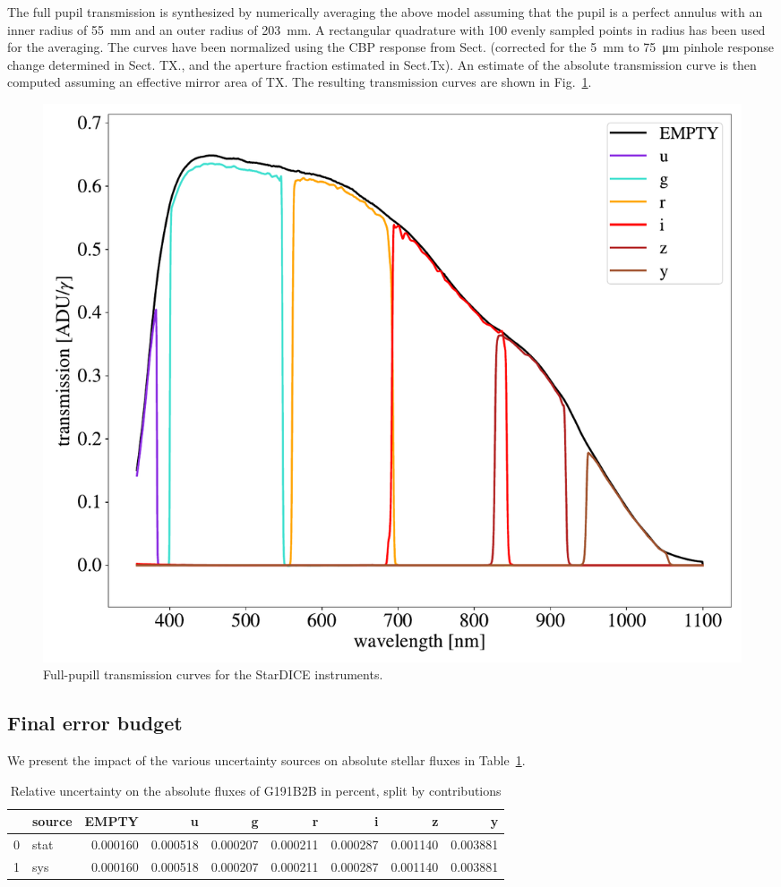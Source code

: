 The full pupil transmission is synthesized by numerically averaging
the above model assuming that the pupil is a perfect annulus with an
inner radius of \SI{55}{mm} and an outer radius of \SI{203}{mm}. A
rectangular quadrature with 100 evenly sampled points in radius has
been used for the averaging. The curves have been normalized using the
CBP response from Sect. (corrected for the \SI{5}{mm} to
\SI{75}{\micro\meter} pinhole response change determined in Sect. TX.,
and the aperture fraction estimated in Sect.Tx).  An estimate of the
absolute transmission curve is then computed assuming an effective
mirror area of TX. The resulting transmission curves are shown in
Fig.~\ref{fig:fullpupiltrans}.
\begin{figure}
  \centering
  \includegraphics[width=1\linewidth]{fig/fullpupill.pdf}
  \caption{Full-pupill transmission curves for the StarDICE instruments.}
  \label{fig:fullpupiltrans}
\end{figure}


\subsection{Final error budget}

We present the impact of the various uncertainty sources on absolute
stellar fluxes in Table~\ref{tab:budget}.
\begin{table}
  \centering
  \caption{Relative uncertainty on the absolute fluxes of G191B2B in percent, split by contributions}
  \label{tab:budget}
  \begin{tabular}{llrrrrrrr}
    \toprule
    & source & EMPTY & u & g & r & i & z & y \\
    \midrule
    0 & stat & 0.000160 & 0.000518 & 0.000207 & 0.000211 & 0.000287 & 0.001140 & 0.003881 \\
    1 & sys & 0.000160 & 0.000518 & 0.000207 & 0.000211 & 0.000287 & 0.001140 & 0.003881 \\
    \bottomrule
\end{tabular}
\end{table}